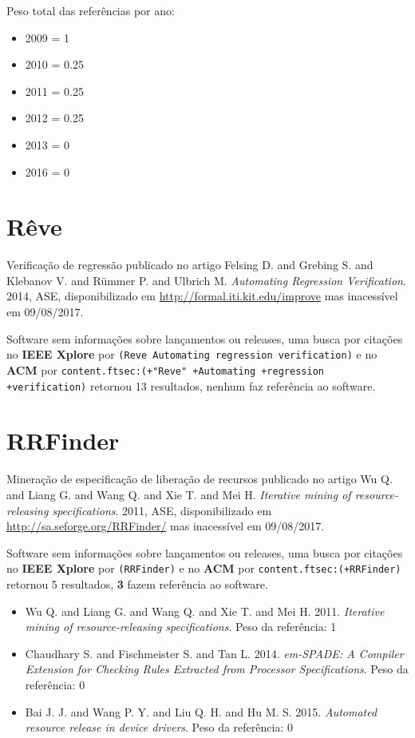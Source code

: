 Peso total das referências por ano:

\begin{itemize}
\item 2009 = 1
\item 2010 = 0.25
\item 2011 = 0.25
\item 2012 = 0.25
\item 2013 = 0
\item 2016 = 0
\end{itemize}


\section{Rêve}

Verificação de regressão
publicado no artigo
Felsing D. and Grebing S. and Klebanov V. and R\"{u}mmer P. and Ulbrich M.
{\it Automating Regression Verification}.
2014,
ASE,
disponibilizado em \url{http://formal.iti.kit.edu/improve}
mas inacessível em 09/08/2017.

Software sem informações sobre lançamentos ou releases,
uma busca por citações no {\bf IEEE Xplore} por
\texttt{(Reve Automating regression verification)}
e no {\bf ACM} por
\texttt{content.ftsec:(+"Reve" +Automating +regression +verification)}
retornou
13 resultados,
nenhum faz referência ao software.


\section{RRFinder}

Mineração de especificação de liberação de recursos
publicado no artigo
Wu Q. and Liang G. and Wang Q. and Xie T. and Mei H.
{\it Iterative mining of resource-releasing specifications}.
2011,
ASE,
disponibilizado em \url{http://sa.seforge.org/RRFinder/}
mas inacessível em 09/08/2017.

Software sem informações sobre lançamentos ou releases,
uma busca por citações no {\bf IEEE Xplore} por
\texttt{(RRFinder)}
e no {\bf ACM} por
\texttt{content.ftsec:(+RRFinder)}
retornou
5 resultados,
{\bf 3} fazem referência ao software.

\begin{itemize}
\item Wu Q. and Liang G. and Wang Q. and Xie T. and Mei H.
      2011.
      {\it Iterative mining of resource-releasing specifications}.
      Peso da referência: 1
\item Chaudhary S. and Fischmeister S. and Tan L.
      2014.
      {\it em-SPADE: A Compiler Extension for Checking Rules Extracted from Processor Specifications}.
      Peso da referência: 0
\item Bai J. J. and Wang P. Y. and Liu Q. H. and Hu M. S.
      2015.
      {\it Automated resource release in device drivers}.
      Peso da referência: 0
\end{itemize}

